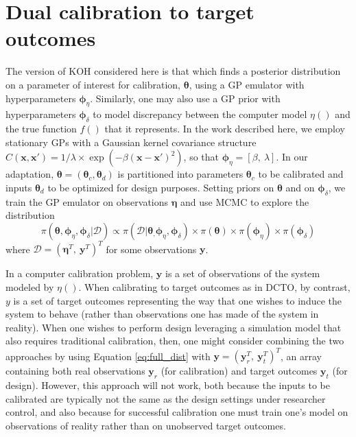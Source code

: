 \documentclass[12pt]{article}
\begin{document}
\section{Dual calibration to target outcomes}\label{sec:dcto}
%
The version of KOH considered here is that which finds a posterior distribution on a parameter of interest for calibration, $\boldsymbol\theta$, using a GP emulator with hyperparameters ${\boldsymbol\phi_\eta}$.
%
Similarly, one may also use a GP prior with hyperparameters $\boldsymbol\phi_\delta$ to model discrepancy between the computer model $\eta()$ and the true function $f()$ that it represents.
%
In the work described here, we employ stationary GPs with a Gaussian kernel covariance structure $C(\mathbf x,\mathbf x') = 1/\lambda \times \exp(-\beta(\mathbf x-\mathbf x')^2)$, so that ${\boldsymbol\phi_\eta} = \left[\beta,\ \lambda\right]$.
%
In our adaptation, $\boldsymbol\theta=(\boldsymbol\theta_c,\boldsymbol\theta_d)$ is partitioned into parameters $\boldsymbol\theta_c$ to be calibrated and inputs $\boldsymbol\theta_d$ to be optimized for design purposes.
%
Setting priors on $\boldsymbol\theta$ and on $\boldsymbol \phi_\delta$, we train the GP emulator on observations $\boldsymbol \eta$ and use MCMC to explore the distribution
\begin{equation} \label{eq:full_dist}
\pi(\boldsymbol \theta,{\boldsymbol\phi_\eta},\boldsymbol \phi_\delta|\mathcal D)
\propto \pi(\mathcal D | \boldsymbol \theta_,{\boldsymbol\phi_\eta}, \boldsymbol\phi_\delta) %
\times \pi(\boldsymbol\theta)
\times \pi(\boldsymbol\phi_\eta)
\times \pi(\boldsymbol\phi_\delta)
\end{equation}
%
where $\mathcal D = (\boldsymbol\eta^T,\ \mathbf y^T)^T$ for some observations $\mathbf y$.
%

%
In a computer calibration problem, $\mathbf y$ is a set of observations of the system modeled by $\eta()$.
%
When calibrating to target outcomes as in DCTO, by contrast, $y$ is a set of target outcomes representing the way that one wishes to induce the system to behave (rather than observations one has made of the system in reality).
%
When one wishes to perform design leveraging a simulation model that also requires traditional calibration, then, one might consider combining the two approaches by using Equation \eqref{eq:full_dist} with $\mathbf y= (\mathbf y_r^T,\ \mathbf y_t^T)^T$, an array containing both real observations $\mathbf y_r$ (for calibration) and target outcomes $\mathbf y_t$ (for design).
%
However, this approach will not work, both because the inputs to be calibrated are typically not the same as the design settings under researcher control, and also because for successful calibration one must train one's model on observations of reality rather than on unobserved target outcomes.
%
\end{document}
